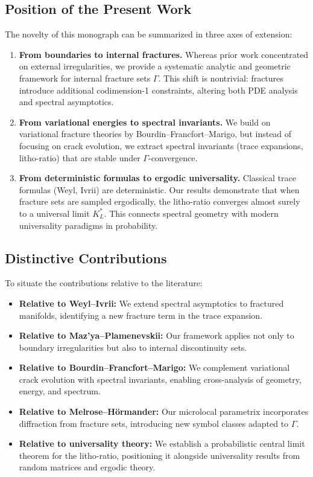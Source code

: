 \subsection*{Position of the Present Work}

The novelty of this monograph can be summarized in three axes of
extension:

\begin{enumerate}
  \item \textbf{From boundaries to internal fractures.} Whereas prior
  work concentrated on external irregularities, we provide a systematic
  analytic and geometric framework for internal fracture sets $\Gamma$.
  This shift is nontrivial: fractures introduce additional codimension-1
  constraints, altering both PDE analysis and spectral asymptotics.

  \item \textbf{From variational energies to spectral invariants.} We
  build on variational fracture theories by Bourdin–Francfort–Marigo,
  but instead of focusing on crack evolution, we extract spectral
  invariants (trace expansions, litho-ratio) that are stable under
  $\Gamma$-convergence.

  \item \textbf{From deterministic formulas to ergodic universality.}
  Classical trace formulas (Weyl, Ivrii) are deterministic. Our results
  demonstrate that when fracture sets are sampled ergodically, the
  litho-ratio converges almost surely to a universal limit $K_L^*$. This
  connects spectral geometry with modern universality paradigms in
  probability.
\end{enumerate}

\subsection*{Distinctive Contributions}

To situate the contributions relative to the literature:

\begin{itemize}
  \item \textbf{Relative to Weyl–Ivrii:} We extend spectral asymptotics
  to fractured manifolds, identifying a new fracture term in the trace
  expansion.
  \item \textbf{Relative to Maz’ya–Plamenevskii:} Our framework applies
  not only to boundary irregularities but also to internal discontinuity
  sets.
  \item \textbf{Relative to Bourdin–Francfort–Marigo:} We complement
  variational crack evolution with spectral invariants, enabling
  cross-analysis of geometry, energy, and spectrum.
  \item \textbf{Relative to Melrose–Hörmander:} Our microlocal
  parametrix incorporates diffraction from fracture sets, introducing
  new symbol classes adapted to $\Gamma$.
  \item \textbf{Relative to universality theory:} We establish a
  probabilistic central limit theorem for the litho-ratio, positioning
  it alongside universality results from random matrices and ergodic
  theory.
\end{itemize}

